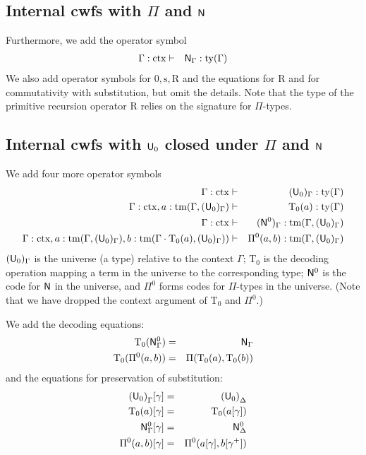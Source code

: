 \documentclass{lmcs}
\newcommand{\s}{\mathrm{s}}
\newcommand{\Rec}{\mathrm{R}}
\newcommand{\Ta}{\mathrm{T}}
\newcommand{\ctx}{\mathrm{ctx}}
\newcommand{\ty}{\mathrm{ty}}
\newcommand{\tm}{\mathrm{tm}}
\begin{document}
\subsection{Internal cwfs with $\Pi$ and $\mathsf{N}$}
Furthermore, we add the operator symbol
\begin{eqnarray*}
\Gamma : \ctx &\vdash& \N_\Gamma : \ty(\Gamma)
\end{eqnarray*}
We also add operator symbols for $0, \s, \Rec$ and the equations for $\Rec$ and for commutativity with substitution, but omit the details. Note that the type of the primitive recursion operator $\Rec$ relies on the signature for $\Pi$-types.

\subsection{Internal cwfs with $\mathsf{U}_0$ closed under $\Pi$ and $\mathsf{N}$}\label{sec:u-example}
We add four more operator symbols
\begin{eqnarray*}
\Gamma : \ctx &\vdash& (\U_0)_\Gamma : \ty(\Gamma)\\
\Gamma : \ctx, a : \tm(\Gamma,(\U_0)_\Gamma) &\vdash& {\Ta_0}(a) : \ty(\Gamma)\\
\Gamma : \ctx &\vdash& (\N^0)_\Gamma : \tm(\Gamma,(\U_0)_\Gamma) \\
\Gamma : \ctx,
a : \tm(\Gamma,(\U_0)_\Gamma),
b :  \tm(\Gamma \cdot \Ta_0(a), (\U_0)_\Gamma))
&\vdash&
 \Pi^0(a,b) : \tm(\Gamma,(\U_0)_\Gamma)
\end{eqnarray*}
$(\mathsf{U}_0)_\Gamma$ is the universe (a type) relative to the context $\Gamma$; $\Ta_0$ is the decoding operation mapping a term in the universe to the corresponding type; $\mathsf{N}^0$ is the code for $\mathsf{N}$ in the universe, and $\Pi^0$ forms codes for $\Pi$-types in the
 universe. (Note that we have dropped the context argument of $\Ta_0$ and $\Pi^0$.)

We add the decoding equations:
\begin{eqnarray*}
\Ta_0(\N^0_\Gamma) &=& \N_\Gamma\\
\Ta_0(\Pi^0(a,b)) &=& \Pi(\Ta_0(a),\Ta_0(b))
\end{eqnarray*}
and the equations for preservation of substitution:
\begin{eqnarray*}
{(\U_0)}_\Gamma [ \gamma ] &=& {(\U_0)}_\Delta\\
\Ta_0(a) [ \gamma ] &=& \Ta_0(a[ \gamma ] )\\
\N^0_\Gamma [ \gamma ] &=&\N^0_\Delta\\
\Pi^0(a,b)[ \gamma ] &=& \Pi^0(a [ \gamma ], b[ \gamma^+ ])
\end{eqnarray*}
\end{document}
